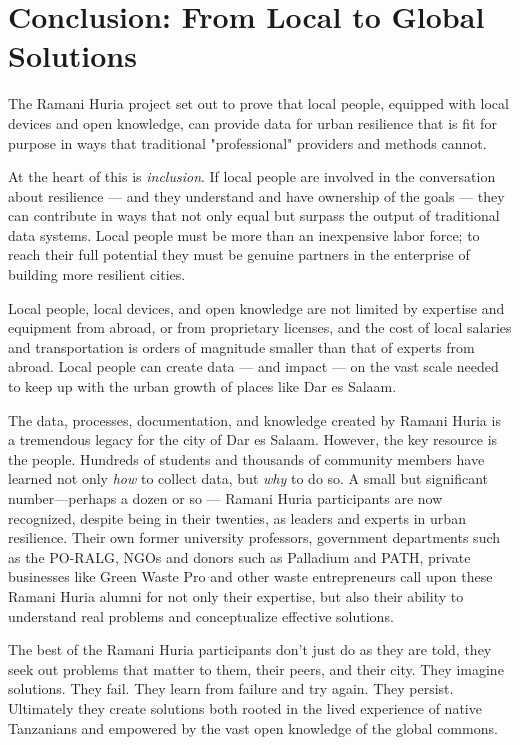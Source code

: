 \documentclass[a4paper,12pt,twoside]{article}
\begin{document}
\section{Conclusion: From Local to Global Solutions}
\begin{multicols}{2}

The Ramani Huria project set out to prove that local people, equipped with local devices and open knowledge, can provide data for urban resilience that is fit for purpose in ways that traditional "professional" providers and methods cannot. 

At the heart of this is \textit{inclusion}. If local people are involved in the conversation about resilience --- and they understand and have ownership of the goals --- they can contribute in ways that not only equal but surpass the output of traditional data systems. Local people must be more than an inexpensive labor force; to reach their full potential they must be genuine partners in the enterprise of building more resilient cities.

Local people, local devices, and open knowledge are not limited by expertise and equipment from abroad, or from proprietary licenses, and the cost of local salaries and transportation is orders of magnitude smaller than that of experts from abroad. Local people can create data --- and impact --- on the vast scale needed to keep up with the urban growth of places like Dar es Salaam.

The data, processes, documentation, and knowledge created by Ramani Huria is a tremendous legacy for the city of Dar es Salaam. However, the key resource is the people. Hundreds of students and thousands of community members have learned not only \textit{how} to collect data, but \textit{why} to do so. A small but significant number---perhaps a dozen or so --- Ramani Huria participants are now recognized, despite being in their twenties, as leaders and experts in urban resilience. Their own former university professors, government departments such as the PO-RALG, NGOs and donors such as Palladium and PATH, private businesses like Green Waste Pro and other waste entrepreneurs call upon these Ramani Huria alumni for not only their expertise, but also their ability to understand real problems and conceptualize effective solutions. 

The best of the Ramani Huria participants don't just do as they are told, they seek out problems that matter to them, their peers, and their city. They imagine solutions. They fail. They learn from failure and try again. They persist. Ultimately they create solutions both rooted in the lived experience of native Tanzanians and empowered by the vast open knowledge of the global commons. 


\end{multicols}
\end{document}
